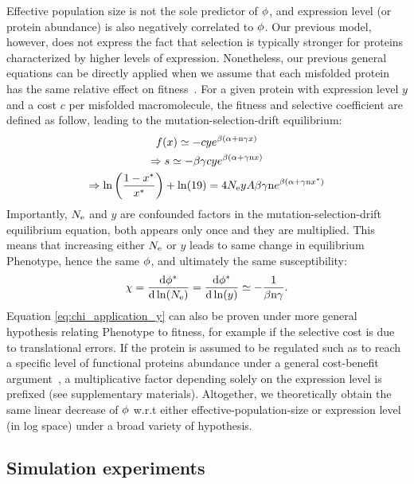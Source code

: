 Effective population size is not the sole predictor of $\phi$, and expression level (or protein abundance) is also negatively correlated to $\phi$.
Our previous model, however, does not express the fact that selection is typically stronger for proteins characterized by higher levels of expression.
Nonetheless, our previous general equations can be directly applied when we assume that each misfolded protein has the same relative effect on fitness~\citep{Drummond2005a, Wilke2006, Drummond2008, Serohijos2012}.
For a given protein with expression level $y$ and a cost $c$ per misfolded macromolecule, the fitness and selective coefficient are defined as follow, leading to the mutation-selection-drift equilibrium:
\begin{gather}
    f (x) \simeq - c y e^{\beta (\alpha + \text{n} \gamma x)} \\
    \Rightarrow s \simeq - \beta \gamma c y e^{\beta(\alpha + \gamma \text{n} x)} \\
    \Rightarrow \ln \left( \frac{1 - x^{*}}{x^{*}} \right) + \ln (19) = 4N_{\mathrm{e}} y A \beta \gamma \text{n} e^{\beta(\alpha + \gamma \text{n} x^{*})}
\end{gather}
Importantly, $N_{\mathrm{e}}$ and $y$ are confounded factors in the mutation-selection-drift equilibrium equation, both appears only once and they are multiplied.
This means that increasing either $N_{\mathrm{e}}$ or $y$ leads to same change in equilibrium \gls{Phenotype}, hence the same $\phi$, and ultimately the same susceptibility:
\begin{align}
    \chi = \frac{ \der \avgpfix\eq}{\der \ln (\Ne)} = \frac{ \der \avgpfix\eq}{\der \ln (y)} \simeq - \frac{1}{\beta \Nsite \gamma}. \label{eq:chi_application_y}
\end{align}
Equation \ref{eq:chi_application_y} can also be proven under more general hypothesis relating \gls{Phenotype} to fitness, for example if the selective cost is due to translational errors.
If the protein is assumed to be regulated such as to reach a specific level of functional proteins abundance under a general cost-benefit argument~\citep{Cherry2010,Gout2010}, a multiplicative factor depending solely on the expression level is prefixed (see supplementary materials).
Altogether, we theoretically obtain the same linear decrease of $\phi$ w.r.t either \gls{effective-population-size} or expression level (in log space) under a broad variety of hypothesis.

\subsection{Simulation experiments}

